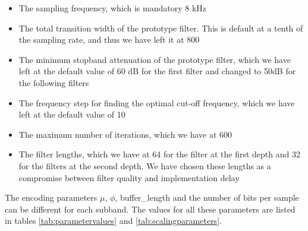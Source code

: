 \documentclass[a4paper]{article}
\begin{document}
\begin{itemize}
\item The sampling frequency, which is mandatory 8 kHz
\item The total transition width of the prototype filter. This is default at a tenth of the sampling rate, and thus we have left it at 800
\item The minimum stopband attenuation of the prototype filter, which we have left at the default value of 60 dB for the first filter and changed to 50dB for the following filters
\item The frequency step for finding the optimal cut-off frequency, which we have left at the default value of 10
\item The maximum number of iterations, which we have at 600
\item The filter lengths, which we have at 64 for the filter at the first depth and 32 for the filters at the second depth. We have chosen these lengths as a compromise between filter quality and implementation delay
\
\end{itemize}

The encoding parameters $\mu$, $\phi$, buffer\_length and the number of bits per sample can be different for each subband. The values for all these parameters are listed in tables \ref{tab:parametervalues} and \ref{tab:scalingparameters}.
\end{document}
